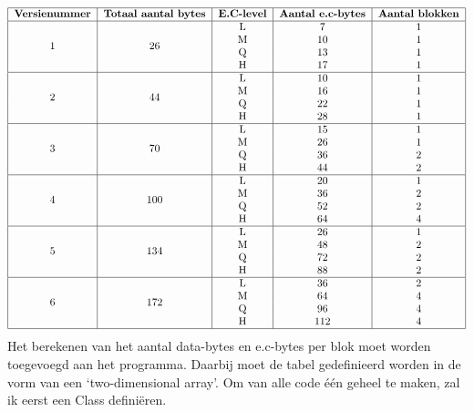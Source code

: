 \documentclass{article}
\begin{document}
\[
\begin{tabular}{|c|c|c|c|c|}
\hline
\bfseries Versienummer & \bfseries Totaal aantal bytes & \bfseries E.C-level & \bfseries Aantal e.c-bytes & \bfseries Aantal blokken\\\hline
\multirow{4}{*}{1} & \multirow{4}{*}{26} &
L & 7  & 1\\&&
M & 10 & 1\\&&
Q & 13 & 1\\&&
H & 17 & 1\\\hline
\multirow{4}{*}{2} & \multirow{4}{*}{44} &
L & 10 & 1\\&&
M & 16 & 1\\&&
Q & 22 & 1\\&&
H & 28 & 1\\\hline
\multirow{4}{*}{3} & \multirow{4}{*}{70} &
L & 15 & 1\\&&
M & 26 & 1\\&&
Q & 36 & 2\\&&
H & 44 & 2\\\hline
\multirow{4}{*}{4} & \multirow{4}{*}{100} &
L & 20 & 1\\&&
M & 36 & 2\\&&
Q & 52 & 2\\&&
H & 64 & 4\\\hline
\multirow{4}{*}{5} & \multirow{4}{*}{134} &
L & 26 & 1\\&&
M & 48 & 2\\&&
Q & 72 & 2\\&&
H & 88 & 2\\\hline
\multirow{4}{*}{6} & \multirow{4}{*}{172} &
L & 36 & 2\\&&
M & 64 & 4\\&&
Q & 96 & 4\\&&
H & 112& 4\\\hline
\end{tabular}
\]
Het berekenen van het aantal data-bytes en e.c-bytes per blok moet worden toegevoegd aan het programma. Daarbij moet de tabel gedefinieerd worden in de vorm van een `two-dimensional array'. Om van alle code één geheel te maken, zal ik eerst een Class definiëren.
\end{document}
